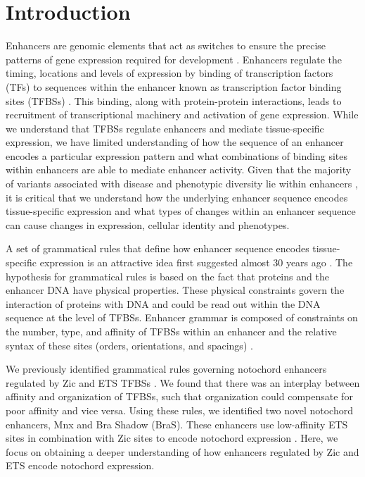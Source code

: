 \section{Introduction}

Enhancers are genomic elements that act as switches to ensure the precise patterns of gene expression required for development \cite{levine2010}. Enhancers regulate the timing, locations and levels of expression by binding of transcription factors (TFs) to sequences within the enhancer known as transcription factor binding sites (TFBSs) \cite{heinz2010,liu2012a,small1992,spitz2012,swanson2010a}. This binding, along with protein-protein interactions, leads to recruitment of transcriptional machinery and activation of gene expression. While we understand that TFBSs regulate enhancers and mediate tissue-specific expression, we have limited understanding of how the sequence of an enhancer encodes a particular expression pattern and what combinations of binding sites within enhancers are able to mediate enhancer activity. Given that the majority of variants associated with disease and phenotypic diversity lie within enhancers \cite{maurano2012a,tak2015a,visel2009}, it is critical that we understand how the underlying enhancer sequence encodes tissue-specific expression and what types of changes within an enhancer sequence can cause changes in expression, cellular identity and phenotypes. 

A set of grammatical rules that define how enhancer sequence encodes tissue-specific expression is an attractive idea first suggested almost 30 years ago \cite{arnone1997,barolo2016a,levo2014,thanos1995}. The hypothesis for grammatical rules is based on the fact that proteins and the enhancer DNA have physical properties. These physical constraints govern the interaction of proteins with DNA and could be read out within the DNA sequence at the level of TFBSs. Enhancer grammar is composed of constraints on the number, type, and affinity of TFBSs within an enhancer and the relative syntax of these sites (orders, orientations, and spacings) \cite{jindal2021}.

We previously identified grammatical rules governing notochord enhancers regulated by Zic and ETS TFBSs \cite{farley2016}. We found that there was an interplay between affinity and organization of TFBSs, such that organization could compensate for poor affinity and vice versa. Using these rules, we identified two novel notochord enhancers, Mnx and Bra Shadow (BraS). These enhancers use low-affinity ETS sites in combination with Zic sites to encode notochord expression \cite{farley2016}. Here, we focus on obtaining a deeper understanding of how enhancers regulated by Zic and ETS encode notochord expression. 

